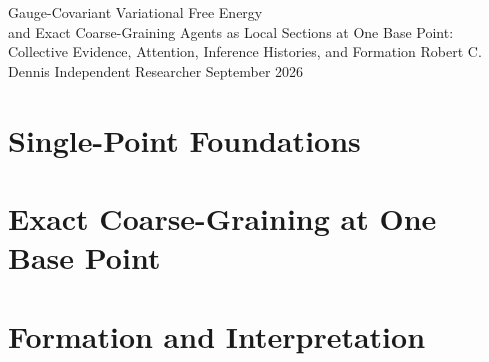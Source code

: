 \documentclass[11pt,letterpaper]{report}
\begin{document}
\hypersetup{pageanchor=false}
\makereporttitle
  {Gauge-Covariant Variational Free Energy\\and Exact Coarse-Graining}
  {Agents as Local Sections at One Base Point: Collective Evidence, Attention, Inference Histories, and Formation}
  {Robert C. Dennis}
  {Independent Researcher}
  {September 2026}

\hypersetup{pageanchor=true}
\tableofcontents
\listoftables
\clearpage
{}

\part{Single-Point Foundations}










\part{Exact Coarse-Graining at One Base Point}





\part{Formation and Interpretation}




\appendix
{}









\end{document}
